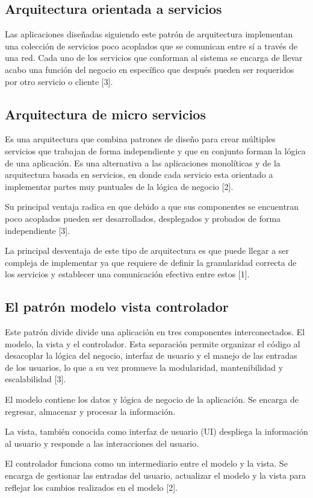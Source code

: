 \subsection{Arquitectura orientada a servicios}

Las aplicaciones diseñadas siguiendo este patrón de arquitectura implementan una colección de servicios poco acoplados que se comunican entre sí a través de una red.
Cada uno de los servicios que conforman al sistema se encarga de llevar acabo una función del negocio en específico que después pueden ser requeridos por otro servicio o cliente [3].


\subsection{Arquitectura de micro servicios}

Es una arquitectura que combina patrones de diseño para crear múltiples servicios que trabajan de forma independiente y que en conjunto forman la lógica de una aplicación. Es una alternativa a las aplicaciones monolíticas y de la arquitectura basada en servicios, en donde cada servicio esta orientado a implementar partes muy puntuales de la lógica de negocio [2].

Su principal ventaja radica en que debido a que sus componentes se encuentran poco acoplados pueden ser desarrollados, desplegados y probados de forma independiente [3].

La principal desventaja de este tipo de arquitectura es que puede llegar a ser compleja de implementar ya que requiere de definir la granularidad correcta de los servicios y establecer una comunicación efectiva entre estos [1].

\subsection{El patrón modelo vista controlador}

Este patrón divide divide una aplicación en tres componentes interconectados. El modelo, la vista y el controlador. Esta separación permite organizar el código al desacoplar la lógica del negocio, interfaz de usuario y el manejo de las entradas de los usuarios, lo que a su vez promueve la modularidad, mantenibilidad y escalabilidad [3]. 

El modelo contiene los datos y lógica de negocio de la aplicación. Se encarga de regresar, almacenar y procesar la información.

La vista, también conocida como interfaz de usuario (UI) despliega la información al usuario y responde a las interacciones del usuario.

El controlador funciona como un intermediario entre el modelo y la vista. Se encarga de gestionar las entradas del usuario, actualizar el modelo y la vista para reflejar los cambios realizados en el modelo [2].

